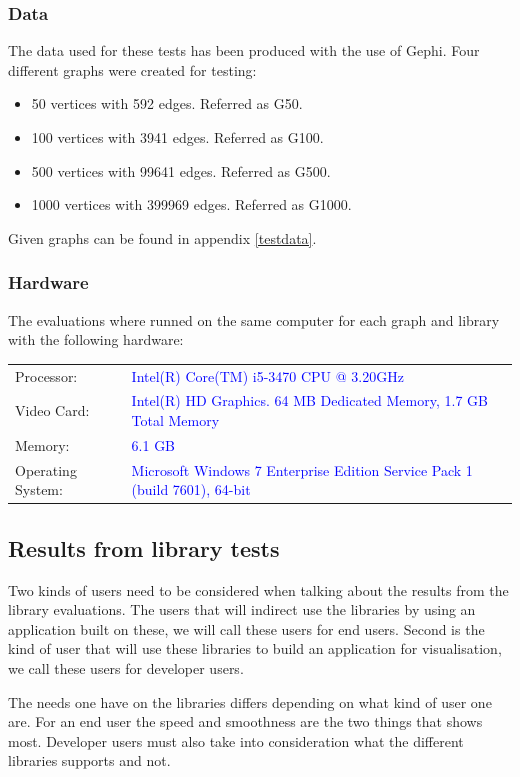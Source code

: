 \documentclass[a4paper,11pt]{kth-mag}
\begin{document}
\begin{appendices}
\subsubsection{Data}
The data used for these tests has been produced with the use of Gephi\cite{website:gephi}. Four different graphs were created for testing:

\begin{itemize}
	\item{50 vertices with 592 edges. Referred as G50.}
	\item{100 vertices with 3941 edges. Referred as G100.}
	\item{500 vertices with 99641 edges. Referred as G500.}
	\item{1000 vertices with 399969 edges. Referred as G1000.}
\end{itemize}
\newline
Given graphs can be found in appendix \ref{testdata}.
\subsubsection{Hardware}
The evaluations where runned on the same computer for each graph and library with the following hardware:\\
\newline
\begin{tabular}{ l l }
	Processor: & \textcolor{blue}{Intel(R) Core(TM) i5-3470 CPU @ 3.20GHz}\\
	Video Card: & \textcolor{blue}{Intel(R) HD Graphics. 64 MB Dedicated Memory, 1.7 GB Total Memory}\\
	Memory: & \textcolor{blue}{6.1 GB}\\
	Operating System: & \textcolor{blue}{Microsoft Windows 7 Enterprise Edition Service Pack 1 (build 7601), 64-bit}\\
\end{tabular}	
\subsection{Results from library tests}
Two kinds of users need to be considered when talking about the results from the library evaluations. The users that will indirect use the libraries by using an application 
built on these, we will call these users for end users. Second is the kind of user that will use these libraries to build an application for visualisation, we call these users for developer users.

The needs one have on the libraries differs depending on what kind of user one are. For an end user the speed and smoothness are the two things that shows most. Developer users must also take into consideration
what the different libraries supports and not.\\


\end{appendices}
\end{document}
